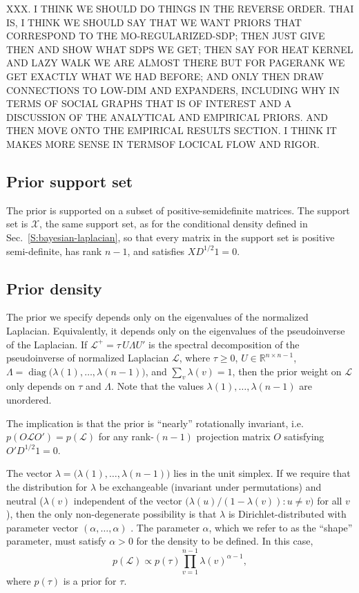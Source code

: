 \documentclass[12pt]{article}
\newcommand{\reals}{\mathbb{R}}
\DeclareMathOperator*{\diag}{diag}
\theoremstyle{plain}
\begin{document}
XXX.  I THINK WE SHOULD DO THINGS IN THE REVERSE ORDER.  THAI IS, I THINK WE SHOULD SAY THAT WE WANT PRIORS THAT CORRESPOND TO THE MO-REGULARIZED-SDP; THEN JUST GIVE THEN AND SHOW WHAT SDPS WE GET; THEN SAY FOR HEAT KERNEL AND LAZY WALK WE ARE ALMOST THERE BUT FOR PAGERANK WE GET EXACTLY WHAT WE HAD BEFORE; AND ONLY THEN DRAW CONNECTIONS TO LOW-DIM AND EXPANDERS, INCLUDING WHY IN TERMS OF SOCIAL GRAPHS THAT IS OF INTEREST AND A DISCUSSION OF THE ANALYTICAL AND EMPIRICAL PRIORS.  AND THEN MOVE ONTO THE EMPIRICAL RESULTS SECTION.  I THINK IT MAKES MORE SENSE IN TERMSOF LOCICAL FLOW AND RIGOR.

\subsection{Prior support set}
\label{S:prior-support}

The prior is supported on a subset of positive-semidefinite
matrices.  The support set is $\mathcal{X}$, the same support set, as
for the conditional density defined in
Sec.~\ref{S:bayesian-laplacian}, so that every matrix in the support
set is positive semi-definite, has rank $n - 1$, and satisfies
$X D^{1/2} 1 = 0$.


\subsection{Prior density}
\label{S:prior-density}

The prior we specify depends only on the eigenvalues of the normalized
Laplacian.  Equivalently, it depends only on the eigenvalues of the pseudoinverse of
the Laplacian.  If $\mathcal{L}^+ = \tau \, U \Lambda U'$ is the spectral
decomposition of the pseudoinverse of normalized Laplacian
$\mathcal{L}$, where $\tau \geq 0$,
$U \in \reals^{n \times n -1}$, 
$\Lambda = \diag\big(\lambda(1), \dotsc, \lambda({n-1})\big)$, and
$\sum_v \lambda(v) = 1$,  then the prior
weight on $\mathcal{L}$ only depends on $\tau$ and $\Lambda$.  Note that the
values $\lambda(1), \dotsc, \lambda(n-1)$ are unordered.

The implication is that the prior is ``nearly'' rotationally
invariant, i.e. $p(O \mathcal{L} O') = p(\mathcal{L})$ for any rank-$(n-1)$
projection matrix $O$ satisfying $O' D^{1/2} 1 = 0$.

The vector $\lambda = \big(\lambda(1), \dotsc, \lambda(n-1)\big)$ lies
in the unit simplex.  If we require that the
distribution for $\lambda$ be exchangeable (invariant under
permutations) and neutral ($\lambda(v)$ independent of the vector
$\big(\lambda(u) / (1 - \lambda(v)) : u \neq v\big)$ for all $v$),
then the only non-degenerate possibility is that $\lambda$ is
Dirichlet-distributed with parameter vector $(\alpha, \ldots, \alpha)$
\cite{fabius1973two}.  The parameter $\alpha$, which we refer to as
the ``shape'' parameter, must satisfy $\alpha > 0$ for the density to
be defined.  In this case,
\begin{equation}\label{E:dirichlet-prior}
  p(\mathcal{L})
   \propto p(\tau) \prod_{v=1}^{n-1} \lambda(v)^{\alpha - 1},
\end{equation}
where $p(\tau)$ is a prior for $\tau$.
\end{document}
